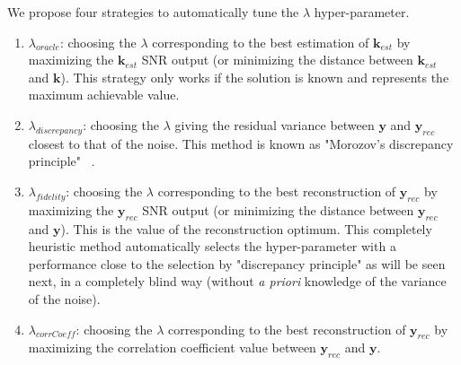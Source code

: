 \documentclass[]{elsarticle} %
\begin{document}
We propose four strategies to automatically tune the $\lambda$ hyper-parameter.
\begin{enumerate}
    \item $\lambda_{oracle}$: choosing the $\lambda$ corresponding to the best estimation of $\textbf{k}_{est}$ by maximizing the $\textbf{k}_{est}$ SNR output (or minimizing the distance between $\textbf{k}_{est}$ and $\textbf{k}$). This strategy only works if the solution is known and represents the maximum achievable value.
    \item $\lambda_{discrepancy}$: choosing the $\lambda$ giving the residual variance between $\textbf{y}$ and $\textbf{y}_{rec}$ closest to that of the noise. This method is known as "Morozov's discrepancy principle" ~\cite{Z_Hydro_Pereverzev2009}.
    \item $\lambda_{fidelity}$: choosing the $\lambda$ corresponding to the best reconstruction of $\textbf {y}_{rec}$ by maximizing the $\textbf{y}_{rec}$ SNR output (or minimizing the distance between $\textbf{y}_{rec}$ and $\textbf{y}$). This is the value of the reconstruction optimum. This completely heuristic method automatically selects the hyper-parameter with a performance close to the selection by "discrepancy principle" as will be seen next, in a completely blind way (without \textit{a priori} knowledge of the variance of the noise).
    \item $\lambda_{corrCoeff}$: choosing the $\lambda$ corresponding to the best reconstruction of $\textbf {y}_{rec}$ by maximizing the correlation coefficient value between $\textbf{y}_{rec}$ and $\textbf{y}$.
\end{enumerate}
\end{document}
